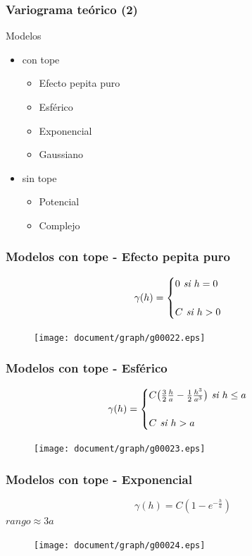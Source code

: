 \documentclass{beamer}
\begin{document}
\begin{frame}
\frametitle{Variograma teórico (2)}
Modelos
\begin{itemize}
\item con tope
\begin{itemize}
\item Efecto pepita puro
\item Esférico
\item Exponencial
\item Gaussiano
\end{itemize}
\item sin tope
\begin{itemize}
\item Potencial
\item Complejo
\end{itemize}
\end{itemize}
\end{frame}

\begin{frame}
\frametitle{Modelos con tope - Efecto pepita puro}
\begin{equation}
\gamma(h) = \begin{cases} 0 \textit{ si } h = 0 \cr\cr C \textit{ si } h > 0 \end{cases}
\end{equation}
\begin{figure}
\texttt{[image: document/graph/g00022.eps]}
\end{figure}
\end{frame}

\begin{frame}
\frametitle{Modelos con tope - Esférico}
\begin{equation}
\gamma(h) = \begin{cases} C\big(\frac{3}{2}\frac{h}{a}-\frac{1}{2}\frac{h^3}{a^3}\big) \textit{ si } h \leq a \cr\cr C \textit{ si } h > a \end{cases}
\end{equation}
\begin{figure}
\texttt{[image: document/graph/g00023.eps]}
\end{figure}
\end{frame}

\begin{frame}
\frametitle{Modelos con tope - Exponencial}
\begin{equation}
\gamma(h) = C(1-e^{-\frac{h}{a}})
\end{equation}
$rango \approx 3a$
\begin{figure}
\texttt{[image: document/graph/g00024.eps]}
\end{figure}
\end{frame}
\end{document}
